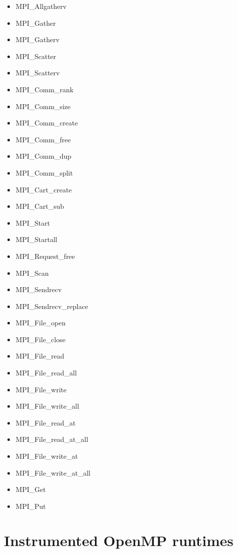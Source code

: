 \begin{itemize}
\item MPI\_Allgatherv
\item MPI\_Gather
\item MPI\_Gatherv
\item MPI\_Scatter
\item MPI\_Scatterv
\item MPI\_Comm\_rank
\item MPI\_Comm\_size
\item MPI\_Comm\_create
\item MPI\_Comm\_free
\item MPI\_Comm\_dup
\item MPI\_Comm\_split
\item MPI\_Cart\_create
\item MPI\_Cart\_sub
\item MPI\_Start
\item MPI\_Startall
\item MPI\_Request\_free
\item MPI\_Scan
\item MPI\_Sendrecv
\item MPI\_Sendrecv\_replace
\item MPI\_File\_open\footnotemark[2]
\item MPI\_File\_close\footnotemark[2]
\item MPI\_File\_read\footnotemark[2]
\item MPI\_File\_read\_all\footnotemark[2]
\item MPI\_File\_write\footnotemark[2]
\item MPI\_File\_write\_all\footnotemark[2]
\item MPI\_File\_read\_at\footnotemark[2]
\item MPI\_File\_read\_at\_all\footnotemark[2]
\item MPI\_File\_write\_at\footnotemark[2]
\item MPI\_File\_write\_at\_all\footnotemark[2]
\item MPI\_Get\footnotemark[3]
\item MPI\_Put\footnotemark[3]
\end{itemize}


\section{Instrumented OpenMP runtimes}\label{sec:OpenMPruntimesinstrumented}

